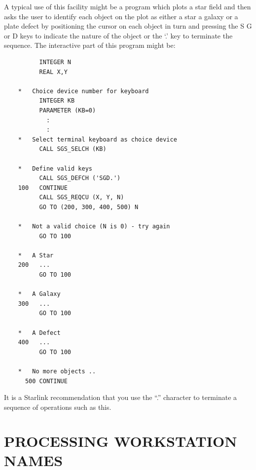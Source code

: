 \documentclass[11pt]{article}
\begin{document}
A typical use of this facility might be a program which plots a star field and
then asks the user to identify each object on the plot as either a star a
galaxy or a plate defect by positioning the cursor on each object in turn and
pressing the S G or D keys to indicate the nature of the object or the `.' key
to terminate the sequence.  The interactive part of this program might be:
\begin{verbatim}
          INTEGER N
          REAL X,Y

    *   Choice device number for keyboard
          INTEGER KB
          PARAMETER (KB=0)
            :
            :
    *   Select terminal keyboard as choice device
          CALL SGS_SELCH (KB)

    *   Define valid keys
          CALL SGS_DEFCH ('SGD.')
    100   CONTINUE
          CALL SGS_REQCU (X, Y, N)
          GO TO (200, 300, 400, 500) N

    *   Not a valid choice (N is 0) - try again
          GO TO 100

    *   A Star
    200   ...
          GO TO 100

    *   A Galaxy
    300   ...
          GO TO 100

    *   A Defect
    400   ...
          GO TO 100

    *   No more objects ..
      500 CONTINUE
\end{verbatim}
It is a Starlink recommendation that you use the ``.'' character to terminate a
sequence of operations such as this.

\section {PROCESSING WORKSTATION NAMES}\label{sec-processing}
\end{document}
